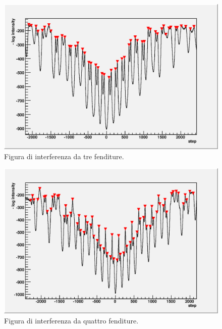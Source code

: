 \documentclass[italian,a4paper]{article}
\begin{document}
\begin{figure}[ph]\centering
\includegraphics[scale=.6]{3slits.outint.eps}
\caption{Figura di interferenza da tre fenditure.}\label{3slitsint}
\end{figure}
\begin{figure}[ph]\centering
\includegraphics[scale=.6]{4slits.outint.eps}
\caption{Figura di interferenza da quattro fenditure.}\label{4slitsint}
\end{figure}
\end{document}
